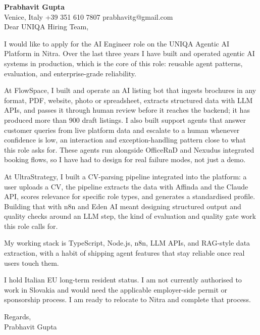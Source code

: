 \documentclass[a4paper,10.5pt]{article}
\begin{document}
\textbf{Prabhavit Gupta}\\
Venice, Italy \textbar{} +39 351 610 7807 \textbar{} prabhavitg@gmail.com\\[10pt]
Dear UNIQA Hiring Team,

I would like to apply for the AI Engineer role on the UNIQA Agentic AI Platform in Nitra. Over the last three years I have built and operated agentic AI systems in production, which is the core of this role: reusable agent patterns, evaluation, and enterprise-grade reliability.

At FlowSpace, I built and operate an AI listing bot that ingests brochures in any format, PDF, website, photo or spreadsheet, extracts structured data with LLM APIs, and passes it through human review before it reaches the backend; it has produced more than 900 draft listings. I also built support agents that answer customer queries from live platform data and escalate to a human whenever confidence is low, an interaction and exception-handling pattern close to what this role asks for. These agents run alongside OfficeRnD and Nexudus integrated booking flows, so I have had to design for real failure modes, not just a demo.

At UltraStrategy, I built a CV-parsing pipeline integrated into the platform: a user uploads a CV, the pipeline extracts the data with Affinda and the Claude API, scores relevance for specific role types, and generates a standardised profile. Building that with n8n and Eden AI meant designing structured output and quality checks around an LLM step, the kind of evaluation and quality gate work this role calls for.

My working stack is TypeScript, Node.js, n8n, LLM APIs, and RAG-style data extraction, with a habit of shipping agent features that stay reliable once real users touch them.

I hold Italian EU long-term resident status. I am not currently authorised to work in Slovakia and would need the applicable employer-side permit or sponsorship process. I am ready to relocate to Nitra and complete that process.

Regards,\\
Prabhavit Gupta
\end{document}
